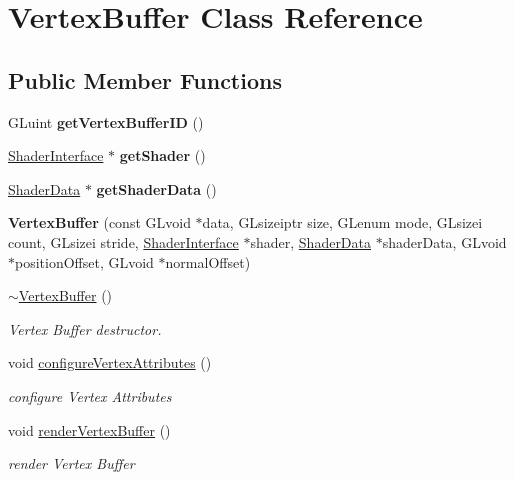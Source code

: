 \hypertarget{class_vertex_buffer}{}\section{Vertex\+Buffer Class Reference}
\label{class_vertex_buffer}
\subsection*{Public Member Functions}
\begin{DoxyCompactItemize}
\item 
\hypertarget{class_vertex_buffer_a58d807701e6c25c15705937b8e699b4d}{}G\+Luint {\bfseries get\+Vertex\+Buffer\+I\+D} ()\label{class_vertex_buffer_a58d807701e6c25c15705937b8e699b4d}

\item 
\hypertarget{class_vertex_buffer_a38b2a3ece59284f1c07020698921f79a}{}\hyperlink{class_shader_interface}{Shader\+Interface} $\ast$ {\bfseries get\+Shader} ()\label{class_vertex_buffer_a38b2a3ece59284f1c07020698921f79a}

\item 
\hypertarget{class_vertex_buffer_a75d299ff5c664c17ccbf076dbddc2dd1}{}\hyperlink{class_shader_data}{Shader\+Data} $\ast$ {\bfseries get\+Shader\+Data} ()\label{class_vertex_buffer_a75d299ff5c664c17ccbf076dbddc2dd1}

\item 
\hypertarget{class_vertex_buffer_a176e74c4c585ce8a70cf8f071c1cbba0}{}{\bfseries Vertex\+Buffer} (const G\+Lvoid $\ast$data, G\+Lsizeiptr size, G\+Lenum mode, G\+Lsizei count, G\+Lsizei stride, \hyperlink{class_shader_interface}{Shader\+Interface} $\ast$shader, \hyperlink{class_shader_data}{Shader\+Data} $\ast$shader\+Data, G\+Lvoid $\ast$position\+Offset, G\+Lvoid $\ast$normal\+Offset)\label{class_vertex_buffer_a176e74c4c585ce8a70cf8f071c1cbba0}

\item 
\hyperlink{class_vertex_buffer_a5216726fdd43b2ae8e1439e347717fdd}{$\sim$\+Vertex\+Buffer} ()
\begin{DoxyCompactList}\small\item\em Vertex Buffer destructor. \end{DoxyCompactList}\item 
void \hyperlink{class_vertex_buffer_a41eade34b8748926aeda6688fa5f61a7}{configure\+Vertex\+Attributes} ()
\begin{DoxyCompactList}\small\item\em configure Vertex Attributes \end{DoxyCompactList}\item 
void \hyperlink{class_vertex_buffer_ae522778b0808bb41609ab871e594499f}{render\+Vertex\+Buffer} ()
\begin{DoxyCompactList}\small\item\em render Vertex Buffer \end{DoxyCompactList}\end{DoxyCompactItemize}


